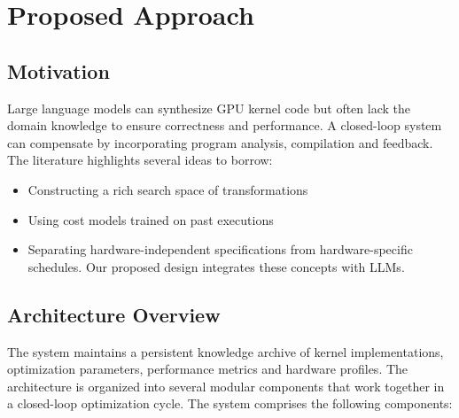 \documentclass{article}
\begin{document}
\section{Proposed Approach}
\subsection{Motivation}

Large language models can synthesize GPU kernel code but often lack the domain knowledge to ensure correctness and performance. A closed-loop system can compensate by incorporating program analysis, compilation and feedback. The literature highlights several ideas to borrow:
\begin{itemize}
    \item {Constructing a rich search space of transformations}
    \item{Using cost models trained on past executions}
    \item{Separating hardware-independent specifications from hardware-specific schedules. Our proposed design integrates these concepts with LLMs. }
\end{itemize}

\subsection{Architecture Overview}

The system maintains a persistent knowledge archive of kernel implementations, optimization parameters, performance metrics and hardware profiles. The architecture is organized into several modular components that work together in a closed-loop optimization cycle. The system comprises the following components:
\end{document}
